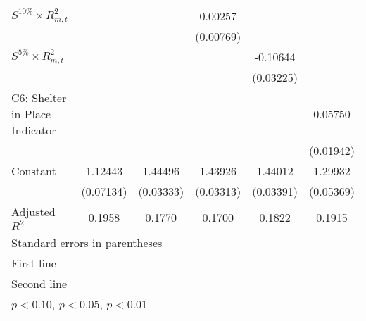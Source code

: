 \begin{table}[htbp]
\begin{tabular}{l*{5}{c}}
$S^{10\%}\times{R_{m,t}^2}$ &                     &                     &     0.00257         &                     &                     \\
                    &                     &                     &   (0.00769)         &                     &                     \\
\addlinespace

$S^{5\%}\times{R_{m,t}^2}$ &                     &                     &                     &    -0.10644\sym{***}&                     \\
                    &                     &                     &                     &   (0.03225)         &                     \\
\addlinespace
C6: Shelter in Place Indicator&                     &                     &                     &                     &     0.05750\sym{***}\\
                    &                     &                     &                     &                     &   (0.01942)         \\
\addlinespace
Constant            &     1.12443\sym{***}&     1.44496\sym{***}&     1.43926\sym{***}&     1.44012\sym{***}&     1.29932\sym{***}\\
                    &   (0.07134)         &   (0.03333)         &   (0.03313)         &   (0.03391)         &   (0.05369)         \\
\midrule
Adjusted $R^2$        &         0.1958         &         0.1770         &         0.1700         &         0.1822         &         0.1915         \\
\bottomrule
\multicolumn{6}{l}{\footnotesize Standard errors in parentheses}\\
\multicolumn{6}{l}{\footnotesize First line}\\
\multicolumn{6}{l}{\footnotesize Second line}\\
\multicolumn{6}{l}{\footnotesize \sym{*} \(p<0.10\), \sym{**} \(p<0.05\), \sym{***} \(p<0.01\)}\\
\end{tabular}
\end{table}
